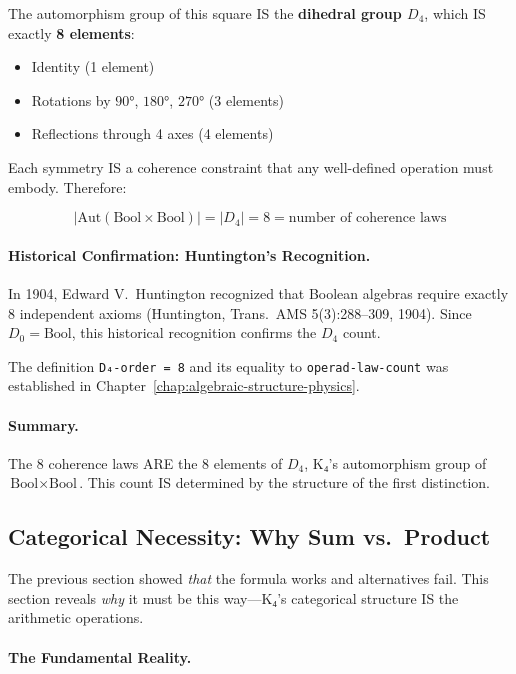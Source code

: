 \documentclass[11pt,a4paper]{book}
\begin{document}
The automorphism group of this square IS the \textbf{dihedral group $D_4$}, 
which IS exactly \textbf{8 elements}:
\begin{itemize}
\item Identity (1 element)
\item Rotations by $90°$, $180°$, $270°$ (3 elements)
\item Reflections through 4 axes (4 elements)
\end{itemize}

Each symmetry IS a coherence constraint that any well-defined 
operation must embody. Therefore:

$$|\text{Aut}(\text{Bool} \times \text{Bool})| = |D_4| = 8 = \text{number of coherence laws}$$

\paragraph{Historical Confirmation: Huntington's Recognition.}

In 1904, Edward V.\ Huntington recognized that Boolean algebras require exactly 
8 independent axioms (Huntington, Trans.\ AMS 5(3):288--309, 1904). Since 
$D_0 = \text{Bool}$, this historical recognition confirms the $D_4$ count.

The definition \verb|D₄-order = 8| and its equality to \verb|operad-law-count| 
was established in Chapter~\ref{chap:algebraic-structure-physics}.

\paragraph{Summary.}

The 8 coherence laws ARE the 8 elements of $D_4$, K₄'s automorphism group of 
$\text{Bool} \times \text{Bool}$. This count IS determined by the structure of the 
first distinction.

\subsection{Categorical Necessity: Why Sum vs.\ Product}
\label{sec:alpha-categorical-necessity}

The previous section showed \emph{that} the formula works and alternatives fail.
This section reveals \emph{why} it must be this way—K₄'s categorical 
structure IS the arithmetic operations.

\paragraph{The Fundamental Reality.}
\end{document}
